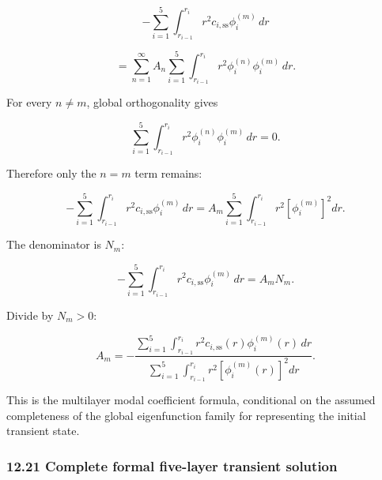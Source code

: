 \documentclass[11pt,a4paper]{article}
\begin{document}
\begin{equation}
-\sum_{i=1}^{5}
\int_{r_{i-1}}^{r_i}
r^2
c_{i,\mathrm{ss}}
\phi_i^{(m)}
\,dr
\end{equation}

\begin{equation}
=
\sum_{n=1}^{\infty}
A_n
\sum_{i=1}^{5}
\int_{r_{i-1}}^{r_i}
r^2
\phi_i^{(n)}
\phi_i^{(m)}
\,dr.
\tag{TRISO-ML-548}
\label{eq:triso-ml-548}
\end{equation}

For every $n\ne m$, global orthogonality gives

\begin{equation}
\sum_{i=1}^{5}
\int_{r_{i-1}}^{r_i}
r^2
\phi_i^{(n)}
\phi_i^{(m)}
\,dr
=
0.
\tag{TRISO-ML-549}
\label{eq:triso-ml-549}
\end{equation}

Therefore only the $n=m$ term remains:

\begin{equation}
-\sum_{i=1}^{5}
\int_{r_{i-1}}^{r_i}
r^2
c_{i,\mathrm{ss}}
\phi_i^{(m)}
\,dr
=
A_m
\sum_{i=1}^{5}
\int_{r_{i-1}}^{r_i}
r^2
\left[
\phi_i^{(m)}
\right]^2
dr.
\tag{TRISO-ML-550}
\label{eq:triso-ml-550}
\end{equation}

The denominator is $N_m$:

\begin{equation}
-\sum_{i=1}^{5}
\int_{r_{i-1}}^{r_i}
r^2
c_{i,\mathrm{ss}}
\phi_i^{(m)}
\,dr
=
A_mN_m.
\tag{TRISO-ML-551}
\label{eq:triso-ml-551}
\end{equation}

Divide by $N_m>0$:

\begin{equation}
\boxed{
A_m
=
-
\frac{
\displaystyle
\sum_{i=1}^{5}
\int_{r_{i-1}}^{r_i}
r^2
c_{i,\mathrm{ss}}(r)
\phi_i^{(m)}(r)
\,dr
}{
\displaystyle
\sum_{i=1}^{5}
\int_{r_{i-1}}^{r_i}
r^2
\left[
\phi_i^{(m)}(r)
\right]^2
dr
}.
}
\tag{TRISO-ML-552}
\label{eq:triso-ml-552}
\end{equation}

This is the multilayer modal coefficient formula, conditional on the assumed completeness of the global eigenfunction family for representing the initial transient state.

\subsubsection*{12.21 Complete formal five-layer transient solution}
\end{document}
